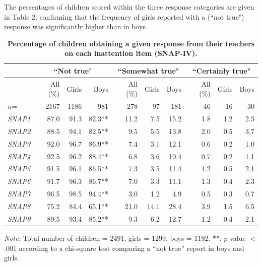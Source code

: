 \documentclass[10pt,letterpaper]{article}
\begin{document}
The percentages of children scored within the three response categories are given in Table 2, confirming that the  frequency of girls reported with a (``not true") response was significantly higher than in boys. \\

\vspace{5mm}

\begin{table}[!ht]
\begin{adjustwidth}{-5mm}{0in}
\centering
\caption{ \bf Percentage of children obtaining a given response from their teachers on each inattention item (SNAP-IV).} 
\vspace{5mm}
\begin{tabular}{|lrrr|rrr|rrr|}
\hline
                & \multicolumn{3}{c|}{``Not true"}  &  \multicolumn{3}{c}{``Somewhat true"}\ &  \multicolumn{3}{|c|}{``Certainly true"}\\ \hline
                    & All  (\%) & Girls & Boys  & All (\%)  & Girls & Boys & All  (\%) & Girls & Boys\\  
                     $n$=&2167 & 1186 & 981 &278 &97 & 181 &46 & 16 & 30\\\hline
{\it SNAP1}   & 87.0 & 91.3 & 82.3**  & 11.2 & 7.5   & 15.2  & 1.8 & 1.2 & 2.5\\  \hline
{\it SNAP2}  &88.5 & 94.1   & 82.5** & 9.5 & 5.5 & 13.8 & 2.0 & 0.5 & 3.7\\  \hline
{\it SNAP3}   & 92.0  &  96.7 &  86.9** & 7.4 & 3.1 & 12.1 & 0.6 & 0.2 & 1.0 \\   \hline
{\it SNAP4}   & 92.5  & 96.2   & 88.4**  & 6.8 & 3.6 & 10.4 & 0.7& 0.2 & 1.1 \\   \hline
{\it SNAP5}  &  91.5 & 96.1 & 86.5**  & 7.3 & 3.5  & 11.4  &1.2 & 0.5 & 2.1  \\   \hline
{\it SNAP6}   & 91.7 & 96.3 & 86.7**  & 7.0 & 3.3 & 11.1 & 1.3 & 0.4 & 2.3 \\   \hline
{\it SNAP7}   & 96.5 & 98.5   & 94.4**   & 3.0  & 1.2 & 4.9 & 0.5 & 0.3 & 0.7 \\   \hline
{\it SNAP8}   & 75.2 & 84.4   & 65.1**  & 21.0  & 14.1  & 28.4 &  3.9 & 1.5 & 6.5\\    \hline
{\it SNAP9}   & 89.5 & 93.4 & 85.2** & 9.3 & 6.2 & 12.7 & 1.2 & 0.4  & 2.1 \\  \hline
\end{tabular}
\label{Numerical_SNAP}
\end{adjustwidth}
\textit{Note:} {Total number of children = $2491$, girls = $1299$, boys = $1192$.  **: $p$ value $<$.001 according to a chi-square test comparing a ``not true'' report in boys and girls.} \\ 
\end{table}
\end{document}
